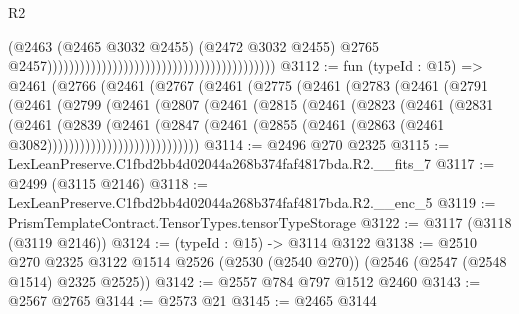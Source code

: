 \begin{lexlean}{R2}
\begin{coremodule}
                                                                                      (@2463
                                                                                        (@2465
                                                                                          @3032
                                                                                          @2455)
                                                                                        (@2472
                                                                                          @3032
                                                                                          @2455)
                                                                                        @2765
                                                                                        @2457))))))))))))))))))))))))))))))))))))))))))
@3112 := fun (typeId : @15) =>
  @2461
    (@2766
      (@2461
        (@2767
          (@2461
            (@2775
              (@2461
                (@2783
                  (@2461
                    (@2791
                      (@2461
                        (@2799
                          (@2461
                            (@2807
                              (@2461
                                (@2815
                                  (@2461
                                    (@2823
                                      (@2461
                                        (@2831
                                          (@2461
                                            (@2839
                                              (@2461
                                                (@2847
                                                  (@2461
                                                    (@2855
                                                      (@2461
                                                        (@2863
                                                          (@2461 @3082))))))))))))))))))))))))))))
@3114 := @2496 @270 @2325
@3115 := LexLeanPreserve.C1fbd2bb4d02044a268b374faf4817bda.R2.__fits_7
@3117 := @2499 (@3115 @2146)
@3118 := LexLeanPreserve.C1fbd2bb4d02044a268b374faf4817bda.R2.__enc_5
@3119 := PrismTemplateContract.TensorTypes.tensorTypeStorage
@3122 := @3117 (@3118 (@3119 @2146))
@3124 := (typeId : @15) -> @3114 @3122
@3138 := @2510
    @270
    @2325
    @3122
    @1514
    @2526
    (@2530 (@2540 @270))
    (@2546 (@2547 (@2548 @1514) @2325 @2525))
@3142 := @2557 @784 @797 @1512 @2460
@3143 := @2567 @2765
@3144 := @2573 @21
@3145 := @2465 @3144

\end{coremodule}
\end{lexlean}
